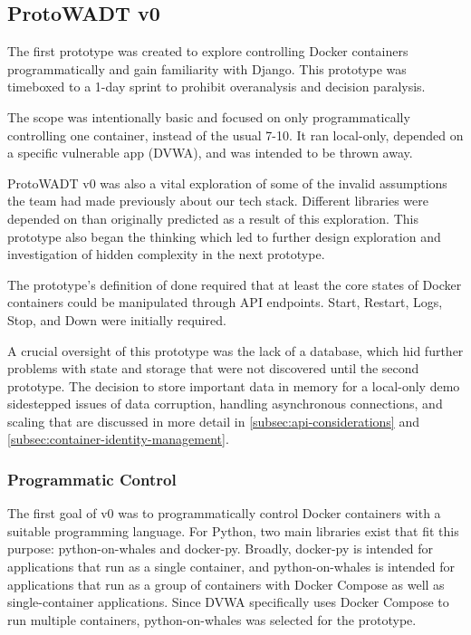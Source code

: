 \documentclass[../design-document.tex]{subfiles}
\begin{document}
\subsection{ProtoWADT v0}
The first prototype was created to explore controlling Docker containers programmatically and gain familiarity with Django. This prototype was timeboxed to a 1-day sprint to prohibit overanalysis and decision paralysis.

The scope was intentionally basic and focused on only programmatically controlling one container, instead of the usual 7-10. It ran local-only,
depended on a specific vulnerable app (DVWA), and was intended to be thrown away.

ProtoWADT v0 was also a vital exploration of some of the invalid assumptions the team had made previously about our tech stack. Different libraries were depended on than originally predicted as a result of this exploration. This prototype also began the thinking which led to further design exploration and investigation of hidden complexity in the next prototype.

The prototype's definition of done required that at least the core states of Docker containers could be manipulated through API endpoints. Start, Restart, Logs, Stop, and Down were initially required.

A crucial oversight of this prototype was the lack of a database, which hid further problems with state and storage that were not discovered until the second prototype. The decision to store important data in memory for a local-only demo sidestepped issues of data corruption, handling asynchronous connections, and scaling that are discussed in more detail in \ref{subsec:api-considerations} and \ref{subsec:container-identity-management}.

\subsubsection{Programmatic Control}
The first goal of v0 was to programmatically control Docker containers with a suitable programming language. For Python, two main libraries exist that fit this purpose: python-on-whales and docker-py. Broadly, docker-py is intended for applications that run as a single container, and python-on-whales is intended for applications that run as a group of containers with Docker Compose as well as single-container applications. Since DVWA specifically uses Docker Compose to run multiple containers, python-on-whales was selected for the prototype.
\end{document}
